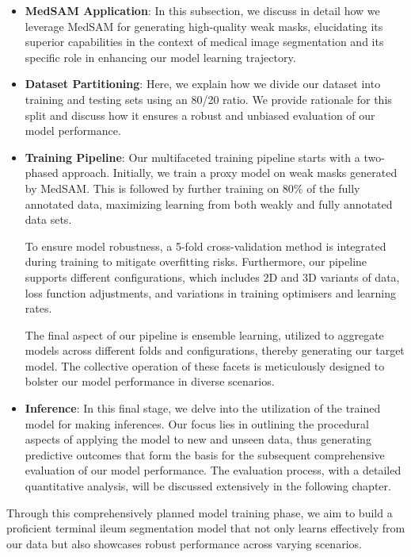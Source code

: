 \begin{itemize}
\item \textbf{MedSAM Application}:
In this subsection, we discuss in detail how we leverage MedSAM for generating high-quality weak masks, elucidating its superior capabilities in the context of medical image segmentation and its specific role in enhancing our model learning trajectory.

\item \textbf{Dataset Partitioning}:
Here, we explain how we divide our dataset into training and testing sets using an 80/20 ratio. We provide rationale for this split and discuss how it ensures a robust and unbiased evaluation of our model performance.

\item \textbf{Training Pipeline}:
Our multifaceted training pipeline starts with a two-phased approach. Initially, we train a proxy model on weak masks generated by MedSAM. This is followed by further training on 80\% of the fully annotated data, maximizing learning from both weakly and fully annotated data sets.

To ensure model robustness, a 5-fold cross-validation method is integrated during training to mitigate overfitting risks. Furthermore, our pipeline supports different configurations, which includes 2D and 3D variants of data, loss function adjustments, and variations in training optimisers and learning rates.

The final aspect of our pipeline is ensemble learning, utilized to aggregate models across different folds and configurations, thereby generating our target model. The collective operation of these facets is meticulously designed to bolster our model performance in diverse scenarios.

\item \textbf{Inference}:
In this final stage, we delve into the utilization of the trained model for making inferences. Our focus lies in outlining the procedural aspects of applying the model to new and unseen data, thus generating predictive outcomes that form the basis for the subsequent comprehensive evaluation of our model performance. The evaluation process, with a detailed quantitative analysis, will be discussed extensively in the following chapter.
\end{itemize}

Through this comprehensively planned model training phase, we aim to build a proficient terminal ileum segmentation model that not only learns effectively from our data but also showcases robust performance across varying scenarios.

